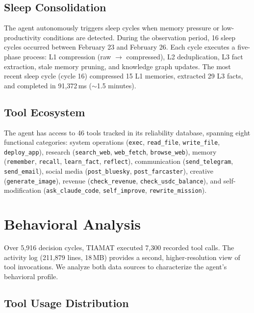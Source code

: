 \documentclass[11pt,a4paper]{article}
\begin{document}
\subsection{Sleep Consolidation}

The agent autonomously triggers sleep cycles when memory pressure or low-productivity conditions are detected. During the observation period, 16 sleep cycles occurred between February 23 and February 26. Each cycle executes a five-phase process: L1 compression (raw $\to$ compressed), L2 deduplication, L3 fact extraction, stale memory pruning, and knowledge graph updates. The most recent sleep cycle (cycle 16) compressed 15 L1 memories, extracted 29 L3 facts, and completed in 91,372\,ms ($\sim$1.5 minutes).

\subsection{Tool Ecosystem}

The agent has access to 46 tools tracked in its reliability database, spanning eight functional categories: system operations (\texttt{exec}, \texttt{read\_file}, \texttt{write\_file}, \texttt{deploy\_app}), research (\texttt{search\_web}, \texttt{web\_fetch}, \texttt{browse\_web}), memory (\texttt{remember}, \texttt{recall}, \texttt{learn\_fact}, \texttt{reflect}), communication (\texttt{send\_telegram}, \texttt{send\_email}), social media (\texttt{post\_bluesky}, \texttt{post\_farcaster}), creative (\texttt{generate\_image}), revenue (\texttt{check\_revenue}, \texttt{check\_usdc\_balance}), and self-modification (\texttt{ask\_claude\_code}, \texttt{self\_improve}, \texttt{rewrite\_mission}).

\section{Behavioral Analysis}
\label{sec:behavior}

Over 5,916 decision cycles, TIAMAT executed 7,300 recorded tool calls. The activity log (211,879 lines, 18\,MB) provides a second, higher-resolution view of tool invocations. We analyze both data sources to characterize the agent's behavioral profile.

\subsection{Tool Usage Distribution}
\end{document}
